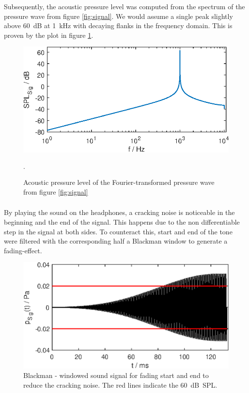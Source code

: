 \newpage

Subsequently, the acoustic pressure level was computed from the spectrum of the pressure wave from figure \ref{fig:signal}. We would assume a single peak slightly above \SI{60}{dB} at \SI{1}{\kilo\Hz} with decaying flanks in the frequency domain. This is proven by the plot in figure \ref{fig:pegel_fft}.
\begin{figure}[h] 
  \centering
  \includegraphics[width=.9\linewidth]{ue2/L_U_sig.eps} %
  \caption{Acoustic pressure level of the Fourier-transformed pressure wave from figure \ref{fig:signal}}.
  \label{fig:pegel_fft}
\end{figure}

\clearpage
\subsubsection{}
By playing the sound on the headphones, a cracking noise is noticeable in the beginning and the end of the signal. This happens due to the non differentiable step in the signal at both sides. To counteract this, start and end of the tone were filtered with the corresponding half a Blackman window to generate a fading-effect.

\begin{figure}[h] 
  \centering
  \includegraphics[width=.9\linewidth]{ue2/soundsig.eps} %
  \caption{Blackman - windowed sound signal for fading start and end to reduce the cracking noise. The red lines indicate the \SI{60}{dB SPL}.}
  \label{fig:sound}
\end{figure}



